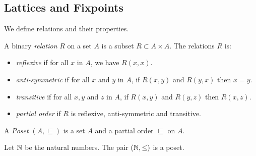 


\subsection{Lattices and Fixpoints}
We define relations and their properties. 

\begin{definition}[Relation]
A binary \emph{relation} $R$ on a set $A$ is a subset $R \subset A\times A$.
The relations $R$ is:
\begin{itemize}
    \item \emph{reflexive} if for all $x$ in $A$, we have $R(x,x)$.
    \item \emph{anti-symmetric} if for all $x$ and $y$ in $A$, if $R(x,y)$ and $R(y,x)$ then $x=y$.
    \item \emph{transitive} if for all $x,y$ and $z$ in $A$, if $R(x,y)$ and $R(y,z)$ then $R(x,z)$.
    \item \emph{partial order} if $R$ is reflexive, anti-symmetric and transitive.
\end{itemize}
\end{definition}

\begin{definition}[Poset]
     A \emph{Poset} $(A,\sqsubseteq)$ is a set $A$ and a partial order $\sqsubseteq$ on $A$.
\end{definition}


\begin{example}
    Let $\mathbb{N}$ be the natural numbers. The pair $(\mathbb{N},\leq)$ is a poset.
\begin{center}
 \end{center}
\end{example}

   
